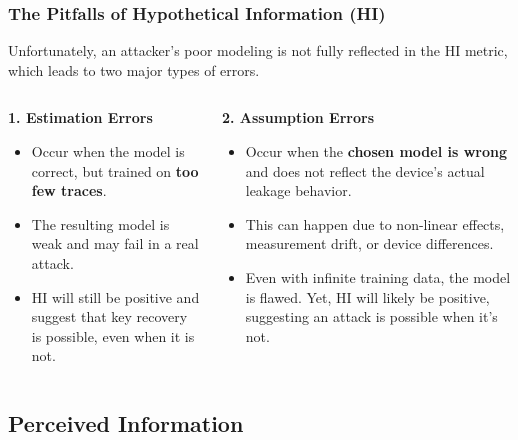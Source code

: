 \begin{frame}
    \frametitle{The Pitfalls of Hypothetical Information (HI)}
    
        Unfortunately, an attacker's poor modeling is not fully reflected in the HI metric, which leads to two major types of errors.
    
    \begin{columns}[T] %
        \begin{column}{0.5\textwidth}
            \textbf{1. Estimation Errors}
            \begin{itemize}
                \item Occur when the model is correct, but trained on \textbf{too few traces}.
                \item The resulting model is weak and may fail in a real attack.
                \item HI will still be positive and suggest that key recovery is possible, even when it is not.
            \end{itemize}
        \end{column}
        
        \begin{column}{0.5\textwidth}
            \textbf{2. Assumption Errors}
            \begin{itemize}
                \item Occur when the \textbf{chosen model is wrong} and does not reflect the device's actual leakage behavior.
                \item This can happen due to non-linear effects, measurement drift, or device differences.
                \item Even with infinite training data, the model is flawed. Yet, HI will likely be positive, suggesting an attack is possible when it's not.
            \end{itemize}
        \end{column}
    \end{columns}
\end{frame} 

\subsection{Perceived Information}


